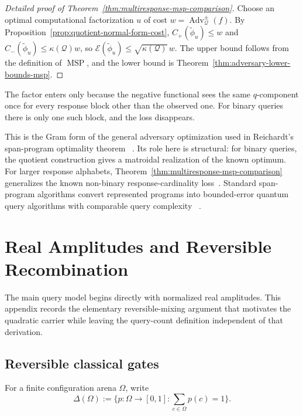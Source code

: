 \documentclass[11pt]{article}
\numberwithin{equation}{section}
\theoremstyle{remark}
\begin{document}
\begin{proof}[Detailed proof of Theorem~\ref{thm:multiresponse-msp-comparison}]
Choose an optimal computational factorization $u$ of cost
$w=\operatorname{Adv}^{\pm}_{\mathcal Q}(f)$. By
Proposition~\ref{prop:quotient-normal-form-cost},
$C_+(\widetilde\phi_u)\leq w$ and
$C_-(\widetilde\phi_u)\leq\kappa(\mathcal Q)w$, so
$\mathcal E(\widetilde\phi_u)\leq\sqrt{\kappa(\mathcal Q)}\,w$. The upper
bound follows from the definition of $\operatorname{MSP}$, and the lower
bound is Theorem~\ref{thm:adversary-lower-bounds-msp}.
\end{proof}

The factor enters only because the negative functional sees the same
$q$-component once for every response block other than the observed one. For
binary queries there is only one such block, and the loss disappears.

This is the Gram form of the general adversary optimization used in
Reichardt's span-program optimality theorem
~\cite{Reichardt2009,Reichardt2014Equivalent}. Its role here is structural:
for binary queries, the quotient construction gives a matroidal realization
of the known optimum. For larger response alphabets,
Theorem~\ref{thm:multiresponse-msp-comparison} generalizes the known
non-binary response-cardinality loss~\cite{BeigiTaghavi2019}. Standard
span-program algorithms convert represented programs into bounded-error
quantum query algorithms with comparable query complexity
~\cite{Reichardt2011,Reichardt2014Equivalent}.




\section{Real Amplitudes and Reversible Recombination}
\label{app:square-root-carrier}

The main query model begins directly with normalized real amplitudes. This
appendix records the elementary reversible-mixing argument that motivates the
quadratic carrier while leaving the query-count definition independent of
that derivation.

\subsection{Reversible classical gates}

For a finite configuration arena $\Omega$, write
\begin{equation}
    \Delta(\Omega):=\{p:\Omega\to[0,1]:\sum_{c\in\Omega}p(c)=1\}.
\end{equation}
\end{document}
